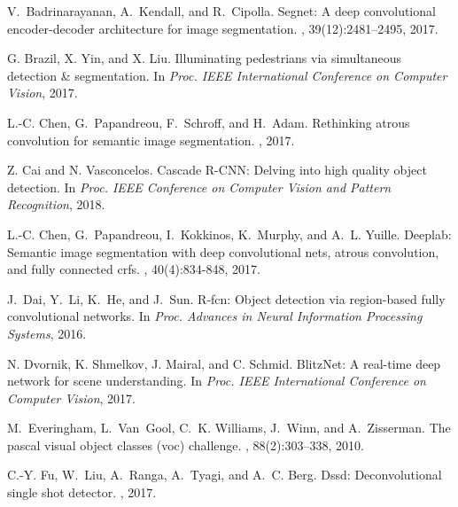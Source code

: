 \documentclass[10pt,twocolumn,letterpaper]{article}
\begin{document}
\begin{thebibliography}{10}\itemsep=-1pt

V.~Badrinarayanan, A.~Kendall, and R.~Cipolla.
\newblock Segnet: A deep convolutional encoder-decoder architecture for image segmentation.
,  39(12):2481--2495, 2017.

G. Brazil, X. Yin, and X. Liu.
Illuminating pedestrians via simultaneous detection \& segmentation.
\newblock In {\em Proc. IEEE International Conference on Computer Vision}, 2017.

L.-C. Chen, G.~Papandreou, F.~Schroff, and H.~Adam.
\newblock Rethinking atrous convolution for semantic image segmentation.
, 2017.

Z. Cai and N. Vasconcelos.
Cascade R-CNN: Delving into high quality object detection.
\newblock In {\em Proc. IEEE Conference on Computer Vision and Pattern Recognition},  2018.

L.-C. Chen, G.~Papandreou, I.~Kokkinos, K.~Murphy, and A.~L. Yuille.
\newblock Deeplab: Semantic image segmentation with deep convolutional nets, atrous convolution, and fully connected crfs.
, 40(4):834-848, 2017.

J.~Dai, Y.~Li, K.~He, and J.~Sun.
\newblock R-fcn: Object detection via region-based fully convolutional  networks.
\newblock In {\em Proc. Advances in Neural Information Processing Systems}, 2016.

N. Dvornik, K. Shmelkov, J. Mairal, and C. Schmid.
BlitzNet: A real-time deep network for scene understanding.
\newblock In {\em Proc. IEEE International Conference on Computer Vision}, 2017.

M.~Everingham, L.~Van~Gool, C.~K. Williams, J.~Winn, and A.~Zisserman.
\newblock The pascal visual object classes (voc) challenge.
, 88(2):303--338, 2010.

C.-Y. Fu, W.~Liu, A.~Ranga, A.~Tyagi, and A.~C. Berg.
\newblock Dssd: Deconvolutional single shot detector.
, 2017.


\end{thebibliography}
\end{document}
